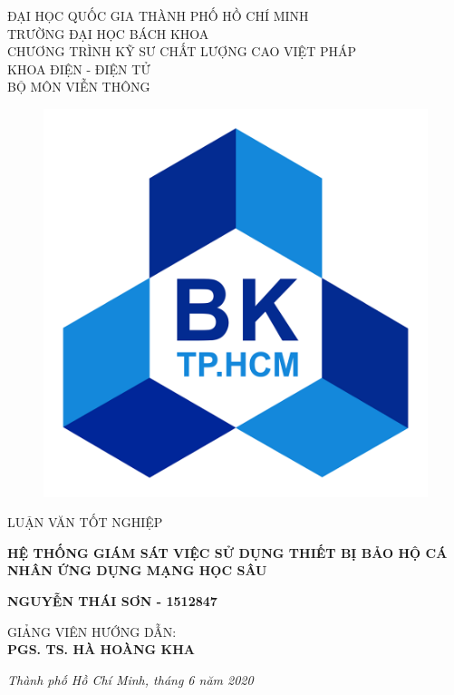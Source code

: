 \documentclass[12pt]{report}
\begin{document}
\begin{titlepage}
\centering
{\large ĐẠI HỌC QUỐC GIA THÀNH PHỐ HỒ CHÍ MINH\\}
{\large TRƯỜNG ĐẠI HỌC BÁCH KHOA\\}
{\large CHƯƠNG TRÌNH KỸ SƯ CHẤT LƯỢNG CAO VIỆT PHÁP\\}
{\large KHOA ĐIỆN - ĐIỆN TỬ\\}
{\large BỘ MÔN VIỄN THÔNG}

\begin{figure}[h]
  \centerline{\includegraphics[scale=0.1]{images/logo_bk.png}}
\end{figure}

\vspace{0.3cm}

{\Large LUẬN VĂN TỐT NGHIỆP}

\vspace{0.7cm}

{\LARGE\bfseries HỆ THỐNG GIÁM SÁT VIỆC SỬ DỤNG THIẾT BỊ BẢO HỘ CÁ NHÂN ỨNG DỤNG MẠNG HỌC SÂU}

\vspace{0.7cm}

{\large\bfseries NGUYỄN THÁI SƠN - 1512847}

\vspace{0.7cm}

{\large GIẢNG VIÊN HƯỚNG DẪN:\\}
{\large\bfseries PGS. TS. HÀ HOÀNG KHA}

\vfill

{\itshape Thành phố Hồ Chí Minh, tháng 6 năm 2020}
\end{titlepage}
\end{document}
